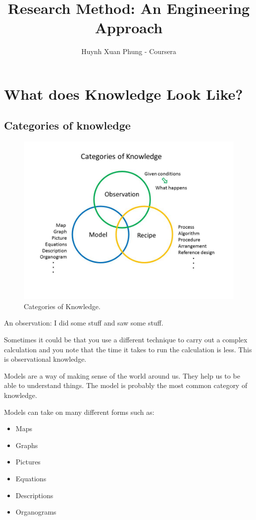 \documentclass{article}
\title{Research Method: An Engineering Approach}
\author{Huynh Xuan Phung - Coursera}
\date{ }
\begin{document}
 
\maketitle
 
\tableofcontents

\section{What does Knowledge Look Like?}

\subsection{Categories of knowledge}

\begin{figure}
\includegraphics[scale=0.6]{figures/CategoriesOfKnowledge.png}
\caption{Categories of Knowledge.}
\end{figure}
 
An observation: I did some stuff and saw some stuff. 

Sometimes it could be that you use a different technique to carry out a complex calculation and you note that the time it takes to run the calculation is less. This is observational knowledge.

Models are a way of making sense of the world around us. They help us to be able to understand things. The model is probably the most common category of knowledge.

Models can take on many different forms such as:

\begin{itemize}
\item{Maps}
\item{Graphs}
\item{Pictures}
\item{Equations}
\item{Descriptions}
\item{Organograms}
\end{itemize}
\end{document}
